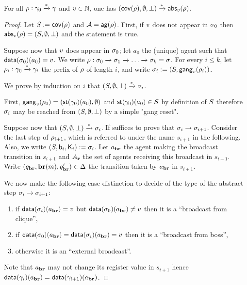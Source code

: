 \begin{lemma}
\label{lem:proof_completeness_covset_constant}
For all $\rho: \gamma_0 \xrightarrow{*} \gamma$ and $v \in \mathbb{N}$, one has $(\mathsf{cov}(\rho), \emptyset, \bot) \xrightarrow{*} \mathsf{abs}_{v}(\rho)$. 
\end{lemma}
\begin{proof}
Let $S := \mathsf{cov}(\rho)$ and $\mathcal{A} = \mathsf{ag}(\rho)$.
First, if $v$ does not appear in $\sigma_0$ then $\mathsf{abs}_{v}(\rho) = (S, \emptyset, \bot)$ and the statement is true.

Suppose now that $v$ does appear in $\sigma_0$; let $a_0$ the (unique) agent such that $\mathsf{data}(\sigma_0)(a_0) = v$. We write $\rho : \sigma_0 \xrightarrow{} \sigma_1 \xrightarrow{} \dots \xrightarrow{} \sigma_k = \sigma$. For every $i \leq k$, let $\rho_i : \gamma_0 \xrightarrow{*} \gamma_i$ the prefix of $\rho$ of length $i$, and write $\sigma_i := (S, \mathsf{gang}_{v}(\rho_i))$. 

We prove by induction on $i$ that $(S, \emptyset, \bot) \xrightarrow{*} \sigma_i$.

First, $\mathsf{gang}_{v}(\rho_0) = (\mathsf{st}(\gamma_0)(a_0), \emptyset)$ and $\mathsf{st}(\gamma_0)(a_0) \in S$ by definition of $S$ therefore $\sigma_i$ may be reached from $(S, \emptyset, \bot)$ by a simple "gang reset".

Suppose now that $(S, \emptyset, \bot) \xrightarrow{*} \sigma_i$. 
If suffices to prove that $\sigma_i \xrightarrow{} \sigma_{i+1}$. Consider the last step of $\rho_{i+1}$, which is referred to under the name $s_{i+1}$ in the following. Also, we write $(S, \mathsf{b}_i, \mathsf{K}_i) := \sigma_i$. Let $a_{\textbf{br}}$ the agent making the broadcast transition in $s_{i+1}$ and $A_{\textbf{r}}$ the set of agents receiving this broadcast in $s_{i+1}$. Write $(q_{\textbf{br}}, \textbf{br}(m), q_{\textbf{br}}') \in \Delta$ the transition taken by $a_{\textbf{br}}$ in $s_{i+1}$.

We now make the following case distinction to decide of the type of the abstract step $\sigma_i \xrightarrow{} \sigma_{i+1}$:
\begin{enumerate}
\item\label{proof_completeness:case_broadcast_clique} if $\mathsf{data}(\sigma_{i})(a_{\textbf{br}}) = v$ but $\mathsf{data}(\sigma_{0})(a_{\textbf{br}}) \ne v$ then it is a ``broadcast from clique'',
\item\label{proof_completeness:case_broadcast_boss} if $\mathsf{data}(\sigma_0)(a_{\textbf{br}}) = \mathsf{data}(\sigma_{i})(a_{\textbf{br}}) = v$ then it is a ``broadcast from boss'',
\item\label{proof_completeness:case_external_broadcast} otherwise it is an ``external broadcast''. 
\end{enumerate}
Note that $a_{\textbf{br}}$ may not change its register value in $s_{i+1}$ hence $\mathsf{data}(\gamma_i)(a_{\textbf{br}}) = \mathsf{data}(\gamma_{i+1})(a_{\textbf{br}})$. 


\end{proof}
